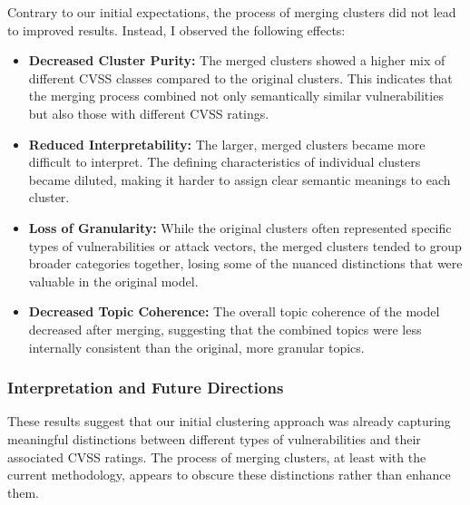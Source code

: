 \documentclass[12pt]{article}
\begin{document}

Contrary to our initial expectations, the process of merging clusters did not lead to improved
results. Instead, I observed the following effects:

\begin{itemize}

	\item \textbf{Decreased Cluster Purity:} The merged clusters showed a higher mix of different
	      CVSS classes compared to the original clusters. This indicates that the merging process
	      combined not only semantically similar vulnerabilities but also those with different CVSS
	      ratings.

	\item \textbf{Reduced Interpretability:} The larger, merged clusters became more difficult to
	      interpret. The defining characteristics of individual clusters became diluted, making it
	      harder to assign clear semantic meanings to each cluster.

	\item \textbf{Loss of Granularity:} While the original clusters often represented specific types
	      of vulnerabilities or attack vectors, the merged clusters tended to group broader categories
	      together, losing some of the nuanced distinctions that were valuable in the original model.

	\item \textbf{Decreased Topic Coherence:} The overall topic coherence of the model decreased
	      after merging, suggesting that the combined topics were less internally consistent than the
	      original, more granular topics.

\end{itemize}

\subsubsection{Interpretation and Future Directions}

These results suggest that our initial clustering approach was already capturing meaningful
distinctions between different types of vulnerabilities and their associated CVSS ratings. The
process of merging clusters, at least with the current methodology, appears to obscure these
distinctions rather than enhance them.
\end{document}
